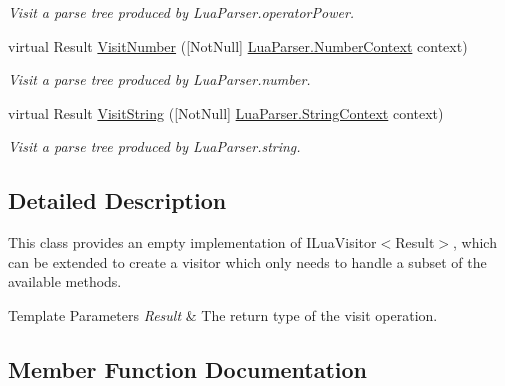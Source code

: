 \begin{DoxyCompactItemize}
\begin{DoxyCompactList}\small\item\em Visit a parse tree produced by Lua\+Parser.\+operator\+Power. \end{DoxyCompactList}\item 
virtual Result \mbox{\hyperlink{classzlua_1_1_lua_base_visitor_af808d09387cef068a139c278c3ab4958}{Visit\+Number}} (\mbox{[}Not\+Null\mbox{]} \mbox{\hyperlink{classzlua_1_1_lua_parser_1_1_number_context}{Lua\+Parser.\+Number\+Context}} context)
\begin{DoxyCompactList}\small\item\em Visit a parse tree produced by Lua\+Parser.\+number. \end{DoxyCompactList}\item 
virtual Result \mbox{\hyperlink{classzlua_1_1_lua_base_visitor_a124ac677211caa574c4c2695e5428538}{Visit\+String}} (\mbox{[}Not\+Null\mbox{]} \mbox{\hyperlink{classzlua_1_1_lua_parser_1_1_string_context}{Lua\+Parser.\+String\+Context}} context)
\begin{DoxyCompactList}\small\item\em Visit a parse tree produced by Lua\+Parser.\+string. \end{DoxyCompactList}\end{DoxyCompactItemize}


\subsection{Detailed Description}
This class provides an empty implementation of I\+Lua\+Visitor$<$\+Result$>$, which can be extended to create a visitor which only needs to handle a subset of the available methods. 


\begin{DoxyTemplParams}{Template Parameters}
{\em Result} & The return type of the visit operation.\\
\hline
\end{DoxyTemplParams}


\subsection{Member Function Documentation}
\mbox{\label{classzlua_1_1_lua_base_visitor_a63b313917c68dfb908b9e8217a2ed5c8}} 
